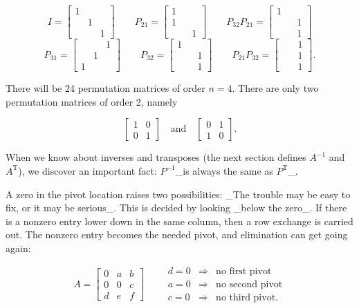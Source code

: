 \[I=\begin{bmatrix}1&&\\ &1&\\ &&1\end{bmatrix}\qquad P_{21}=\begin{bmatrix}1&&\\ 1&&\\ &&1\end{bmatrix}\qquad P_{32}P_{21}=\begin{bmatrix}1&&\\ &&1\\ &&1\end{bmatrix}\] \[P_{31}=\begin{bmatrix}&&1\\ &1&\\ 1&\end{bmatrix}\qquad P_{32}=\begin{bmatrix}1&&\\ &&1\\ &&1\end{bmatrix}\qquad P_{21}P_{32}=\begin{bmatrix}&&1\\ &&1\\ &&1\end{bmatrix}.\]

There will be 24 permutation matrices of order \(n=4\). There are only two permutation matrices of order 2, namely

\[\begin{bmatrix}1&0\\ 0&1\end{bmatrix}\quad\text{and}\quad\begin{bmatrix}0&1\\ 1&0\end{bmatrix}.\]

When we know about inverses and transposes (the next section defines \(A^{-1}\) and \(A^{\mathrm{T}}\)), we discover an important fact: \(P^{-1}\)_is always the same as \(P^{\mathrm{T}}\)_.

A zero in the pivot location raises two possibilities: _The trouble may be easy to fix, or it may be serious_. This is decided by looking _below the zero_. If there is a nonzero entry lower down in the same column, then a row exchange is carried out. The nonzero entry becomes the needed pivot, and elimination can get going again:

\[A=\begin{bmatrix}0&a&b\\ 0&0&c\\ d&e&f\end{bmatrix}\qquad\begin{array}{rcl}d=0&\Longrightarrow&\text{no first pivot}\\ a=0&\Longrightarrow&\text{no second pivot}\\ c=0&\Longrightarrow&\text{no third pivot}.\end{array}\] 